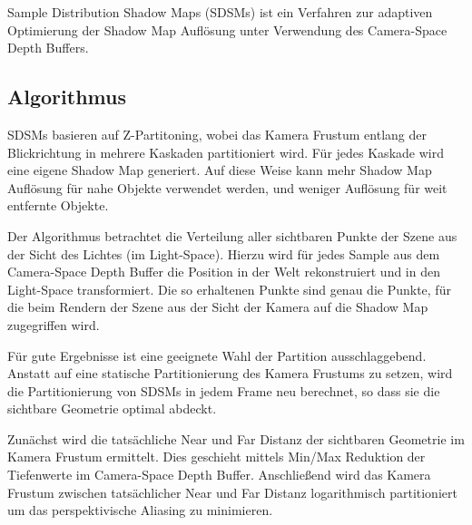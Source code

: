 \documentclass[runningheaders,a4paper]{llncs}
\begin{document}
Sample Distribution Shadow Maps (SDSMs) ist ein Verfahren zur adaptiven Optimierung der Shadow Map Auflösung unter Verwendung des Camera-Space Depth Buffers.

\subsection{Algorithmus}

SDSMs basieren auf Z-Partitoning, wobei das Kamera Frustum entlang der Blickrichtung in mehrere Kaskaden partitioniert wird.
Für jedes Kaskade wird eine eigene Shadow Map generiert.
Auf diese Weise kann mehr Shadow Map Auflösung für nahe Objekte verwendet werden, und weniger Auflösung für weit entfernte Objekte.


Der Algorithmus betrachtet die Verteilung aller sichtbaren Punkte der Szene aus der Sicht des Lichtes (im Light-Space).
Hierzu wird für jedes Sample aus dem Camera-Space Depth Buffer die Position in der Welt rekonstruiert und in den Light-Space transformiert.
Die so erhaltenen Punkte sind genau die Punkte, für die beim Rendern der Szene aus der Sicht der Kamera auf die Shadow Map zugegriffen wird.


Für gute Ergebnisse ist eine geeignete Wahl der Partition ausschlaggebend.
Anstatt auf eine statische Partitionierung des Kamera Frustums \cite{pssm} zu setzen, wird die Partitionierung von SDSMs in jedem Frame neu berechnet, so dass sie die sichtbare Geometrie optimal abdeckt.

Zunächst wird die tatsächliche Near und Far Distanz der sichtbaren Geometrie im Kamera Frustum ermittelt.
Dies geschieht mittels Min/Max Reduktion der Tiefenwerte im Camera-Space Depth Buffer.
Anschließend wird das Kamera Frustum zwischen tatsächlicher Near und Far Distanz logarithmisch partitioniert um das perspektivische Aliasing zu minimieren.
\end{document}
